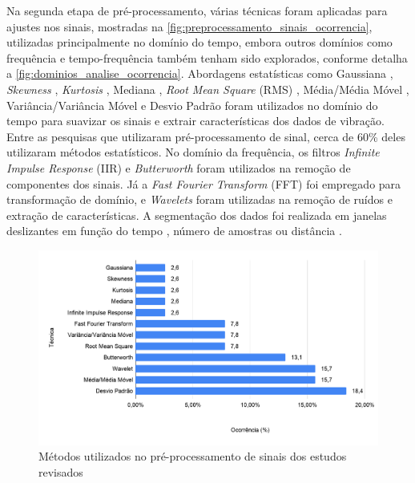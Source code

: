Na segunda etapa de pré-processamento, várias técnicas foram aplicadas para ajustes nos sinais, mostradas na \autoref{fig:preprocessamento_sinais_ocorrencia}, utilizadas principalmente no domínio do tempo, embora outros domínios como frequência e tempo-frequência também tenham sido explorados, conforme detalha a \autoref{fig:dominios_analise_ocorrencia}. Abordagens estatísticas como Gaussiana \cite{Pooja2017}, \textit{Skewness} \cite{Alqudah2016}, \textit{Kurtosis} \cite{Alqudah2016}, Mediana \cite{Alqudah2016,Li2016}, \textit{Root Mean Square} (RMS) \cite{Jang2015,Li2018,Sharma2015}, Média/Média Móvel \cite{Alqudah2016,Andria2016,Bose2018,Li2016, Pholprasit2015,Savera2016,Singh2017}, Variância/Variância Móvel \cite{Alqudah2016,Andria2016} e Desvio Padrão \cite{Andria2016,BelloSalau2018,Hou2017,Lima2016,Pholprasit2015,Prapulla2017} foram utilizados no domínio do tempo para suavizar os sinais e extrair características dos dados de vibração. Entre as pesquisas que utilizaram pré-processamento de sinal, cerca de 60\% deles utilizaram métodos estatísticos. No domínio da frequência, os filtros \textit{Infinite Impulse Response} (IIR) \cite{Wu2018} e \textit{Butterworth} \cite{Hou2017,Niskanen2015,Pitonak2016,Souza2018,Wu2013} foram utilizados na remoção de componentes dos sinais. Já a \textit{Fast Fourier Transform} (FFT) \cite{Allouch2017,Douangphachanh2013,Douangphachanh2014} foi empregado para transformação de domínio, e \textit{Wavelets} \cite{BelloSalau2018,Eftekhari2018,El-Wakeel2018,Gueta2017,Singh2017,Wang2018} foram utilizadas na remoção de ruídos e extração de características. A segmentação dos dados foi realizada em janelas deslizantes em função do tempo \cite{Wang2018}, número de amostras \cite{Singh2017} ou distância \cite{Li2018}. 

\begin{figure}[h!]
  \centering
  \caption{Métodos utilizados no pré-processamento de sinais dos estudos revisados}
   \label{fig:preprocessamento_sinais_ocorrencia}
   \includegraphics[width=1\textwidth]{figuras/fig_17.png}
\end{figure}


